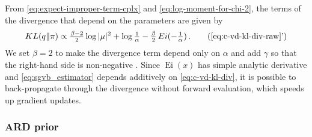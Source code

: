 \documentclass{article}
\begin{document}
From \eqref{eq:expect-improper-term-cplx} and \eqref{eq:log-moment-for-chi-2}, the terms of
the divergence that depend on the parameters are given by
\begin{equation}  \label{eq:c-vd-kl-div}
  KL(q\| \pi)
    \propto
      \tfrac{\beta-2}2 \log{\lvert \mu \rvert^2}
      + \log{\tfrac1{\alpha}}
      - \tfrac{\beta}2 \mathop{Ei}(- \tfrac1{\alpha})
      \,.
      \tag{\ref{eq:c-vd-kl-div-raw}'}
\end{equation}
We set $\beta = 2$ to make the divergence term depend only on $\alpha$ and add $\gamma$
so that the right-hand side is non-negative \citep[eq.(84)]{lapidoth_capacity_2003}.
%
Since $\mathop{Ei}(x)$ has simple analytic derivative and \eqref{eq:sgvb_estimator} depends additively
on \eqref{eq:c-vd-kl-div}, it is possible to back-propagate through the divergence without
forward evaluation, which speeds up gradient updates.


\subsubsection{ARD prior} %
\label{ssub:ard_prior}
\end{document}
